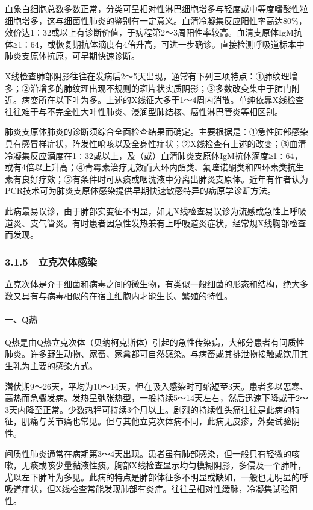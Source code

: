 血象白细胞总数多数正常，分类可呈相对性淋巴细胞增多与轻度或中等度嗜酸性粒细胞增多，这与细菌性肺炎的鉴别有一定意义。血清冷凝集反应阳性率高达80\%，效价达1∶32或以上有诊断价值，于病程第2～3周阳性率较高。血清支原体IgM抗体≥1∶64，或恢复期抗体滴度有4倍升高，可进一步确诊。直接检测呼吸道标本中肺炎支原体抗原，可早期快速诊断。

X线检查肺部阴影往往在发病后2～5天出现，通常有下列三项特点：①肺纹理增多；②沿增多的肺纹理出现不规则的斑片状实质阴影；③多数改变集中于肺门附近。病变所在以下叶为多。上述的X线征大多于1～4周内消散。单纯依靠X线检查往往难于与不完全性大叶性肺炎、浸润型肺结核、癌性淋巴管炎等相区别。

肺炎支原体肺炎的诊断须综合全面检查结果而确定。主要根据是：①急性肺部感染具有感冒样症状，阵发性呛咳以及全身性症状；②X线检查有上述的改变；③血清冷凝集反应滴度在1∶32或以上，及（或）血清肺炎支原体IgM抗体滴度≥1∶64，或有4倍以上升高；④青霉素治疗无效而大环内酯类、氟喹诺酮类和四环素类抗生素有良好疗效；⑤有条件时可从痰或咽洗液中分离出肺炎支原体。近年有作者认为PCR技术可为肺炎支原体感染提供早期快速敏感特异的病原学诊断方法。

此病最易误诊，由于肺部实变征不明显，如无X线检查易误诊为流感或急性上呼吸道炎、支气管炎。有时患者因急性发热兼有上呼吸道炎症状，经常规X线胸部检查而发现。

\subsubsection{3.1.5　立克次体感染}

立克次体是介于细菌和病毒之间的微生物，有类似一般细菌的形态和结构，绝大多数又具有与病毒相似的在宿主细胞内才能生长、繁殖的特性。

\paragraph{一、Q热}

Q热是由Q热立克次体（贝纳柯克斯体）引起的急性传染病，大部分患者有间质性肺炎。许多野生动物、家畜、家禽都可自然感染。与病畜或其排泄物接触或饮用其生乳为主要的感染方式。

潜伏期9～26天，平均为10～14天，但在吸入感染时可缩短至3天。患者多以恶寒、高热而急骤发病。发热呈弛张热型，一般持续5～14天左右，然后迅速下降或于2～3天内降至正常。少数热程可持续3个月以上。剧烈的持续性头痛往往是此病的特征，肌痛与关节痛也常见。但与其他立克次体病不同，此病无皮疹，外斐试验阴性。

间质性肺炎通常在病期第3～4天出现。患者虽有肺部感染，但一般只有轻微的咳嗽，无痰或咳少量黏液性痰。胸部X线检查显示均匀模糊阴影，多侵及一个肺叶，尤以左下肺叶为多见。此病的特点是肺部体征多不明显或缺如，一般也无明显的呼吸道症状，但X线检查常能发现肺部有炎症。往往呈相对性缓脉，冷凝集试验阴性。

